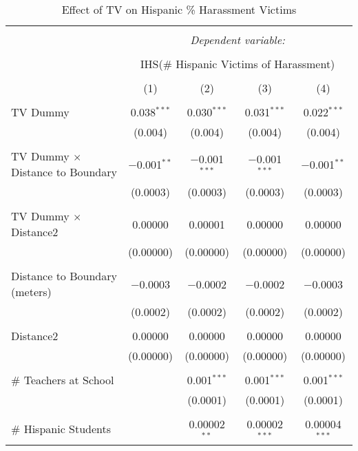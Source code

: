 
\begin{table}[!htbp] \centering 
  \caption{Effect of TV on Hispanic \% Harassment Victims} 
  \label{} 
\begin{tabular}{@{\extracolsep{-2pt}}lcccc} 
\\[-1.8ex]\hline 
\hline \\[-1.8ex] 
 & \multicolumn{4}{c}{\textit{Dependent variable:}} \\ 
\cline{2-5} 
\\[-1.8ex] & \multicolumn{4}{c}{IHS(\# Hispanic Victims of Harassment)} \\ 
\\[-1.8ex] & (1) & (2) & (3) & (4)\\ 
\hline \\[-1.8ex] 
 TV Dummy & 0.038$^{***}$ & 0.030$^{***}$ & 0.031$^{***}$ & 0.022$^{***}$ \\ 
  & (0.004) & (0.004) & (0.004) & (0.004) \\ 
  & & & & \\ 
 TV Dummy $\times$ Distance to Boundary & $-$0.001$^{**}$ & $-$0.001$^{***}$ & $-$0.001$^{***}$ & $-$0.001$^{**}$ \\ 
  & (0.0003) & (0.0003) & (0.0003) & (0.0003) \\ 
  & & & & \\ 
 TV Dummy $\times$ Distance2 & 0.00000 & 0.00001 & 0.00000 & 0.00000 \\ 
  & (0.00000) & (0.00000) & (0.00000) & (0.00000) \\ 
  & & & & \\ 
 Distance to Boundary (meters) & $-$0.0003 & $-$0.0002 & $-$0.0002 & $-$0.0003 \\ 
  & (0.0002) & (0.0002) & (0.0002) & (0.0002) \\ 
  & & & & \\ 
 Distance2 & 0.00000 & 0.00000 & 0.00000 & 0.00000 \\ 
  & (0.00000) & (0.00000) & (0.00000) & (0.00000) \\ 
  & & & & \\ 
 \# Teachers at School &  & 0.001$^{***}$ & 0.001$^{***}$ & 0.001$^{***}$ \\ 
  &  & (0.0001) & (0.0001) & (0.0001) \\ 
  & & & & \\ 
 \# Hispanic Students &  & 0.00002$^{**}$ & 0.00002$^{***}$ & 0.00004$^{***}$ \\ 

\end{tabular}
\end{table}
